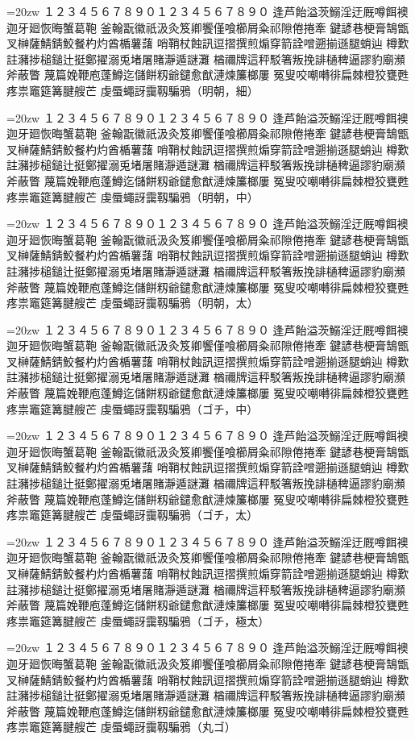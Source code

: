 \documentclass[uplatex]{jsarticle}
\begin{document}
\def\R{\par\noindent%
  \vbox{\LARGE\hsize=20zw\noindent\kanjiskip=0pt
  １２３４５６７８９０１２３４５６７８９０
  逢芦飴溢茨鰯淫迂厩噂餌襖迦牙廻恢晦蟹葛鞄
  釜翰翫徽祇汲灸笈卿饗僅喰櫛屑粂祁隙倦捲牽
  鍵諺巷梗膏鵠甑叉榊薩鯖錆鮫餐杓灼酋楯薯藷
  哨鞘杖蝕訊逗摺撰煎煽穿箭詮噌遡揃遜腿蛸辿
  樽歎註瀦捗槌鎚辻挺鄭擢溺兎堵屠賭瀞遁謎灘
  楢禰牌這秤駁箸叛挽誹樋稗逼謬豹廟瀕斧蔽瞥
  蔑篇娩鞭庖蓬鱒迄儲餅籾爺鑓愈猷漣煉簾榔屢
  冤叟咬嘲囀徘扁棘橙狡甕甦疼祟竈筵篝腱艘芒
  虔蜃蠅訝靄靱騙鴉}}

\selectfont \R（明朝，細）
\selectfont \R（明朝，中）
\selectfont \R（明朝，太）
\selectfont \R（ゴチ，中）
\selectfont \R（ゴチ，太）
\selectfont \R（ゴチ，極太）
\selectfont \R（丸ゴ）
\end{document}
